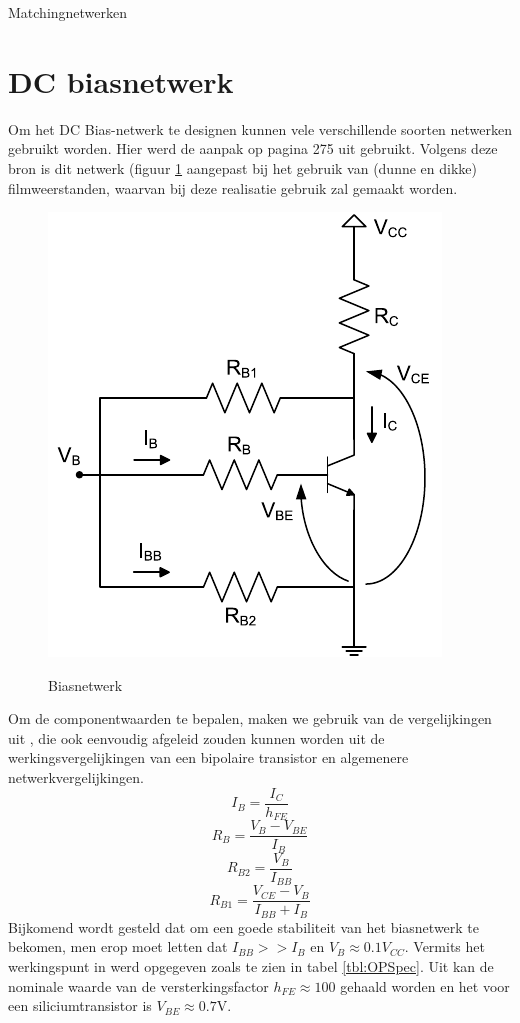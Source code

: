   \begin{table}[h!]
     \begin{center}
       \caption{Matchingnetwerken}
       \label{tbl:Matching}
       
     \end{center}
  \end{table}


\section{DC biasnetwerk}
  Om het DC Bias-netwerk te designen kunnen vele verschillende soorten
  netwerken gebruikt worden. Hier werd de aanpak op pagina 275 uit \cite{Gonzalez}
  gebruikt. Volgens deze bron is dit netwerk (figuur \ref{fig:DCBias} aangepast
  bij het gebruik van (dunne en dikke) filmweerstanden, waarvan bij deze realisatie
  gebruik zal gemaakt worden.

  \begin{figure}
    \centering
    \includegraphics[keepaspectratio=true]{fig/DCBias.pdf}
    \label{fig:DCBias}
    \caption{Biasnetwerk}
  \end{figure}

  Om de componentwaarden te bepalen, maken we gebruik van de vergelijkingen uit
  \cite{Gonzalez}, die ook eenvoudig afgeleid zouden kunnen worden uit de
  werkingsvergelijkingen van een bipolaire transistor en algemenere
  netwerkvergelijkingen.
    \[
      I_B = \frac{I_C}{h_{FE}}
    \]
    \[
      R_B = \frac{V_B - V_{BE}}{I_B}
    \]
    \[
      R_{B2} = \frac{V_B}{I_{BB}}
    \]
    \[
      R_{B1} = \frac{V_{CE} - V_B}{I_{BB} + I_B}
    \]
  Bijkomend wordt gesteld dat om een goede stabiliteit van het biasnetwerk te
  bekomen, men erop moet letten dat $I_{BB} >> I_B$ en $V_{B} \approx 0.1 V_{CC}$.
  Vermits het werkingspunt in \cite{lesWendy} werd opgegeven zoals te zien in
  tabel \ref{tbl:OPSpec}. Uit \cite{BFR91A} kan de nominale waarde van de
  versterkingsfactor $h_{FE} \approx 100$ gehaald worden en het voor een
  siliciumtransistor is $V_{BE} \approx 0.7 \mbox{V}$.

